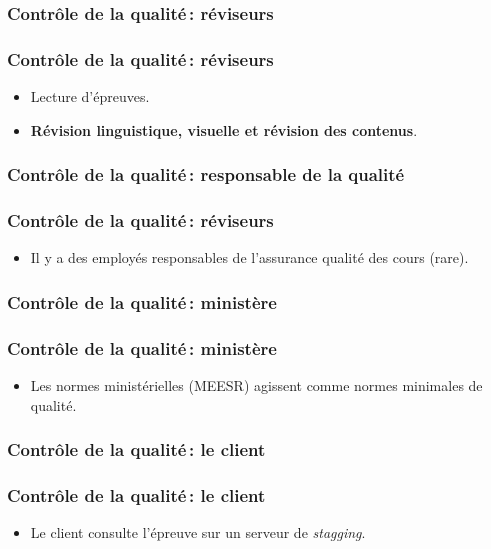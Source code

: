 					\subsubsection{Contrôle de la qualité\,: réviseurs} 
							\begin{frame}[allowframebreaks]
							\frametitle{Contrôle de la qualité\,: réviseurs}
                        			
							\begin{itemize}
							\item Lecture d’épreuves.
							\item \textbf{Révision linguistique,  visuelle et révision des contenus}.
							
							\end{itemize}						
					\end{frame}	
					\subsubsection{Contrôle de la qualité\,: responsable de la qualité} 
							\begin{frame}[allowframebreaks]
							\frametitle{Contrôle de la qualité\,: réviseurs}
                        			
							\begin{itemize}
							\item Il y a des employés responsables de l’assurance qualité des cours (rare).
							\end{itemize}						
					\end{frame}	
					\subsubsection{Contrôle de la qualité\,: ministère} 
							\begin{frame}[allowframebreaks]
							\frametitle{Contrôle de la qualité\,: ministère}
                        			
							\begin{itemize}
							\item Les normes ministérielles (MEESR) agissent comme normes minimales de qualité.
							\end{itemize}						
					\end{frame}	
					\subsubsection{Contrôle de la qualité\,: le client} 
							\begin{frame}[allowframebreaks]
							\frametitle{Contrôle de la qualité\,: le client}
                        			
							\begin{itemize}
							\item Le client consulte l’épreuve sur un serveur de \textit{stagging}.
							\end{itemize}						
					\end{frame}	
					
